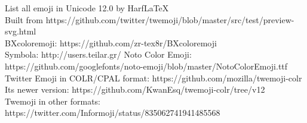 \documentclass[a4paper,12pt]{article}
\begin{document}
\noindent
List all emoji in Unicode 12.0 by HarfLaTeX\\
Built from https://github.com/twitter/twemoji/blob/master/src/test/preview-svg.html\\
BXcoloremoji: https://github.com/zr-tex8r/BXcoloremoji\\
Symbola: http://users.teilar.gr/%
Noto Color Emoji: https://github.com/googlefonts/noto-emoji/blob/master/NotoColorEmoji.ttf\\
Twitter Emoji in COLR/CPAL format: https://github.com/mozilla/twemoji-colr\\
Its newer version: https://github.com/KwanEsq/twemoji-colr/tree/v12\\
Twemoji in other formats: https://twitter.com/Informoji/status/835062741941485568\\
\end{document}
